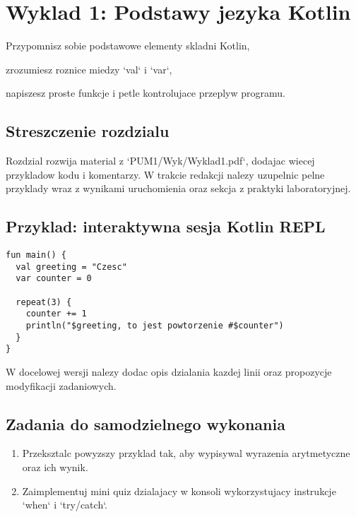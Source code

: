 \chapter{Wyklad 1: Podstawy jezyka Kotlin}

\begin{learningobjectives}
  \item Przypomnisz sobie podstawowe elementy skladni Kotlin,
  \item zrozumiesz roznice miedzy `val` i `var`,
  \item napiszesz proste funkcje i petle kontrolujace przeplyw programu.
\end{learningobjectives}

\section{Streszczenie rozdzialu}
Rozdzial rozwija material z `PUM1/Wyk/Wyklad1.pdf`, dodajac wiecej przykladow kodu i komentarzy. W trakcie redakcji nalezy uzupelnic pelne przyklady wraz z wynikami uruchomienia oraz sekcja  z praktyki laboratoryjnej.

\section{Przyklad: interaktywna sesja Kotlin REPL}
\begin{verbatim}
fun main() {
  val greeting = "Czesc"
  var counter = 0

  repeat(3) {
    counter += 1
    println("$greeting, to jest powtorzenie #$counter")
  }
}
\end{verbatim}

W docelowej wersji nalezy dodac opis dzialania kazdej linii oraz propozycje modyfikacji zadaniowych.

\section{Zadania do samodzielnego wykonania}
\begin{enumerate}[label=Z\arabic*.]
  \item Przeksztalc powyzszy przyklad tak, aby wypisywal wyrazenia arytmetyczne oraz ich wynik.
  \item Zaimplementuj mini quiz dzialajacy w konsoli wykorzystujacy instrukcje `when` i `try/catch`.
\end{enumerate}


